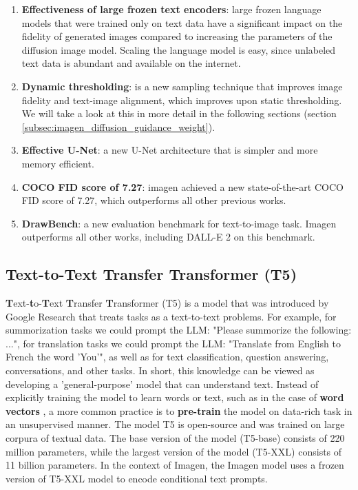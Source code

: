 \begin{enumerate}
    \item \textbf{Effectiveness of large frozen text encoders}: large frozen language models that were trained only on text data have a significant impact on the fidelity of generated images compared to increasing the parameters of the diffusion image model. Scaling the language model is easy, since unlabeled text data is abundant and available on the internet.
    \item \textbf{Dynamic thresholding}: is a new sampling technique that improves image fidelity and text-image alignment, which improves upon static thresholding. We will take a look at this in more detail in the following sections (section \ref{subsec:imagen_diffusion_guidance_weight}).
    \item \textbf{Effective U-Net}: a new U-Net architecture that is simpler and more memory efficient.
    \item \textbf{COCO FID score of 7.27}: imagen achieved a new state-of-the-art COCO FID score of 7.27, which outperforms all other previous works.
    \item \textbf{DrawBench}: a new evaluation benchmark for text-to-image task. Imagen outperforms all other works, including DALL-E 2 \cite{dalle_2} on this benchmark.
\end{enumerate}



















\subsection{Text-to-Text Transfer Transformer (T5)}

\textbf{T}ext-\textbf{t}o-\textbf{T}ext \textbf{T}ransfer \textbf{T}ransformer (T5) \cite{t5_model} is a model that was introduced by Google Research that treats tasks as a text-to-text problems. For example, for summorization tasks we could prompt the LLM: "Please summorize the following: ...", for translation tasks we could prompt the LLM: "Translate from English to French the word 'You'", as well as for text classification, question answering, conversations, and other tasks. In short, this knowledge can be viewed as developing a 'general-purpose' model that can understand text.  Instead of explicitly training the model to learn words or text, such as in the case of \textbf{word vectors} \cite{cbow_word2vec}, a more common practice is to \textbf{pre-train} \cite{bert} the model on data-rich task in an unsupervised manner. The model T5 is open-source and was trained on large corpura of textual data. The base version of the model (T5-base) consists of 220 million parameters, while the largest version of the model (T5-XXL) consists of 11 billion parameters. In the context of Imagen, the Imagen model uses a frozen version of T5-XXL model to encode conditional text prompts.

